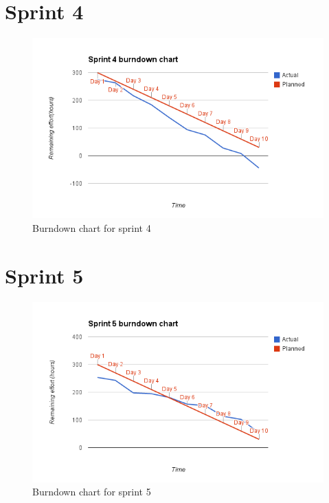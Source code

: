 \section{Sprint 4}
\begin{figure}[H]
\includegraphics[width=\textwidth]{appendix/backlog/burndown4.png}
\caption{Burndown chart for sprint 4}
\end{figure}


\section{Sprint 5}
\begin{figure}[H]
\includegraphics[width=\textwidth]{appendix/backlog/burndown5.png}
\caption{Burndown chart for sprint 5}
\end{figure}


